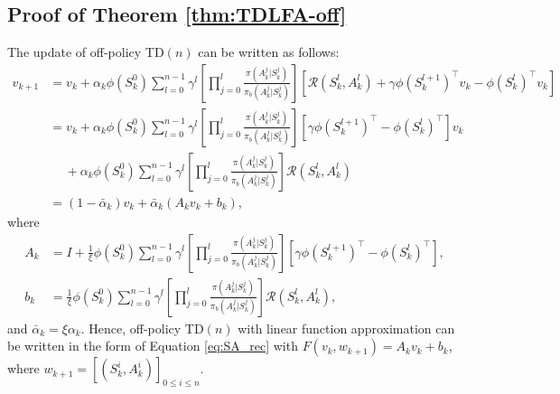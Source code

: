 \documentclass[letterpaper, 10 pt]{article}
\begin{document}
\subsection{Proof of Theorem \ref{thm:TDLFA-off}} \label{proof:TDLFA-off}
     The update of off-policy TD$(n)$ can be written as follows:
        \begin{align*}
        v_{k+1}&=v_k+\alpha_k \phi(S_k^0)\sum_{l=0}^{n-1}\gamma^{l}\left[ \prod_{j=0}^{l} \frac{\pi(A_k^j|S_k^j)}{\pi_b(A_k^j|S_k^j)} \right] \left[\mathcal{R}(S_k^l,A_k^l)\!+\!\gamma  \phi(S_k^{l\!+\!1})^\top v_k\!-\!\phi(S_k^l)^\top v_k\right]\\
        &=v_k+\alpha_k \phi(S_k^0)\sum_{l=0}^{n-1}\gamma^{l}\left[ \prod_{j=0}^{l} \frac{\pi(A_k^j|S_k^j)}{\pi_b(A_k^j|S_k^j)} \right] \left[\!\gamma  \phi(S_k^{l\!+\!1})^\top \!-\!\phi(S_k^l)^\top \right]v_k\\
        &\quad~+\alpha_k \phi(S_k^0)\sum_{l=0}^{n-1}\gamma^{l}\left[ \prod_{j=0}^{l} \frac{\pi(A_k^j|S_k^j)}{\pi_b(A_k^j|S_k^j)} \right] \mathcal{R}(S_k^l,A_k^l)\\
        &=(1-\bar{\alpha}_k)v_k+\bar{\alpha}_k(A_k v_k + b_k),
        \end{align*}
        where
        \begin{align*}
            A_k & =I+\frac{1}{\xi}\phi(S_k^0)\sum_{l=0}^{n-1}\gamma^{l}\left[ \prod_{j=0}^{l} \frac{\pi(A_k^j|S_k^j)}{\pi_b(A_k^j|S_k^j)} \right] \left[\!\gamma  \phi(S_k^{l\!+\!1})^\top \!-\!\phi(S_k^l)^\top \right], \\
            b_k&= \frac{1}{\xi}\phi(S_k^0)\sum_{l=0}^{n-1}\gamma^{l}\left[ \prod_{j=0}^{l} \frac{\pi(A_k^j|S_k^j)}{\pi_b(A_k^j|S_k^j)} \right] \mathcal{R}(S_k^l,A_k^l),   
        \end{align*} 
        and $\bar{\alpha}_k=\xi\alpha_k$. Hence, off-policy TD$(n)$ with linear function approximation can be written in the form of Equation \eqref{eq:SA_rec} with $F(v_k,w_{k+1}) = A_kv_k+b_k$, where $w_{k+1} = [(S_k^i,A_k^i)]_{0\leq i\leq n}$. 
        
\end{document}
